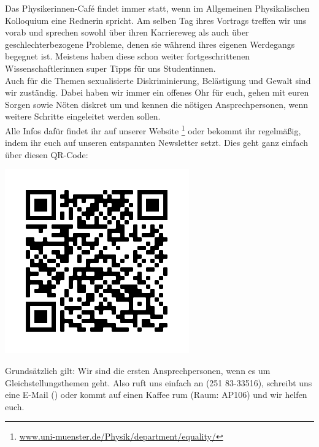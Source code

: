 \begin{multicols}{2}
Das Physikerinnen-Café findet immer statt, wenn im Allgemeinen Physikalischen Kolloquium eine Rednerin spricht. Am selben Tag ihres Vortrags treffen wir uns vorab und sprechen sowohl über ihren Karriereweg als auch über geschlechterbezogene Probleme, denen sie während ihres eigenen Werdegangs begegnet ist. Meistens haben diese schon weiter fortgeschrittenen Wissenschaftlerinnen super Tipps für uns Studentinnen. \\

Auch für die Themen sexualisierte Diskriminierung, Belästigung und Gewalt sind wir zuständig. Dabei haben wir immer ein offenes Ohr für euch, gehen mit euren Sorgen sowie Nöten diskret um und kennen die nötigen Ansprechpersonen, wenn weitere Schritte eingeleitet werden sollen. \\

Alle Infos dafür findet ihr auf unserer Website \footnote{\url{www.uni-muenster.de/Physik/department/equality/}} oder bekommt ihr regelmäßig, indem ihr euch auf unseren entspannten Newsletter setzt. Dies geht ganz einfach über diesen QR-Code: \\
\begin{center}
    \includegraphics[width=\columnwidth]{res/gst_QR.png} %
\end{center}

Grundsätzlich gilt: Wir sind die ersten Ansprechpersonen, wenn es um Gleichstellungsthemen geht. Also ruft uns einfach an (251 83-33516), schreibt uns eine E-Mail (\textbf{}) oder kommt auf einen Kaffee rum (Raum: AP106) und wir helfen euch. \\


\end{multicols}


